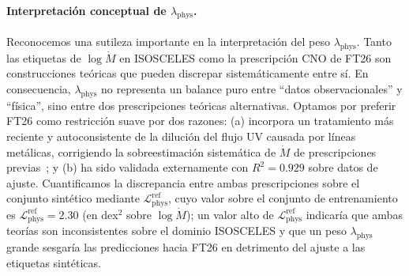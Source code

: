 \documentclass[sigconf,ACM]{acmart}
\begin{document}
\paragraph{Interpretación conceptual de $\lambda_\mathrm{phys}$.}
Reconocemos una sutileza importante en la interpretación del peso $\lambda_\mathrm{phys}$. Tanto las etiquetas de $\log\dot{M}$ en ISOSCELES como la prescripción CNO de FT26 son construcciones teóricas que pueden discrepar sistemáticamente entre sí. En consecuencia, $\lambda_\mathrm{phys}$ no representa un balance puro entre ``datos observacionales'' y ``física'', sino entre dos prescripciones teóricas alternativas. Optamos por preferir FT26 como restricción suave por dos razones: (a) incorpora un tratamiento más reciente y autoconsistente de la dilución del flujo UV causada por líneas metálicas, corrigiendo la sobreestimación sistemática de $\dot{M}$ de prescripciones previas~\cite{FigueroaTapia2026}; y (b) ha sido validada externamente con $R^2 = 0.929$ sobre datos de ajuste. Cuantificamos la discrepancia entre ambas prescripciones sobre el conjunto sintético mediante $\mathcal{L}_\mathrm{phys}^\mathrm{ref}$, cuyo valor sobre el conjunto de entrenamiento es $\mathcal{L}_\mathrm{phys}^\mathrm{ref}=2.30$ (en dex$^2$ sobre $\log\dot{M}$); un valor alto de $\mathcal{L}_\mathrm{phys}^\mathrm{ref}$ indicaría que ambas teorías son inconsistentes sobre el dominio ISOSCELES y que un peso $\lambda_\mathrm{phys}$ grande sesgaría las predicciones hacia FT26 en detrimento del ajuste a las etiquetas sintéticas.
\end{document}
